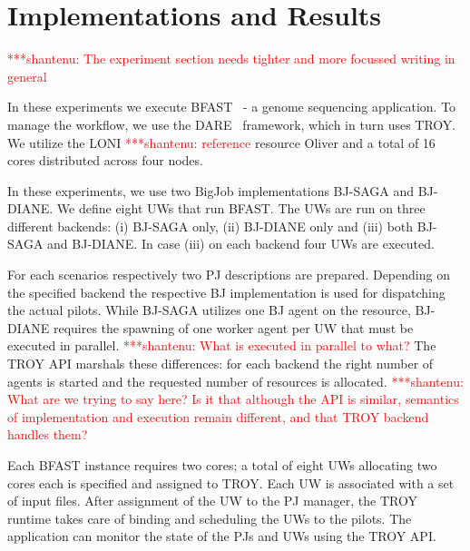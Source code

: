 \documentclass[conference,final]{IEEEtran}
\newcommand{\jhanote}[1]{ {\textcolor{red} { ***shantenu: #1 }}}
\newcommand{\smnote}[1]{ {\textcolor{green} { ***sharath: #1 }}}
\newcommand{\smnote}[1]{}
\newcommand{\jhanote}[1]{}
\newcommand{\upp}{\vspace*{-0.5em}}
\begin{document}
\section{Implementations and Results\upp\upp}


\jhanote{The experiment section needs tighter and more focussed
  writing in general}

In these experiments we execute BFAST~\cite{bfast2009} - a genome
sequencing application. To manage the workflow, we use the
DARE~\cite{dare-tg11} framework, which in turn uses TROY.  We utilize
the LONI\jhanote{reference} resource Oliver and a total of 16 cores
distributed across four nodes.

In these experiments, we use two BigJob implementations BJ-SAGA and
BJ-DIANE. We define eight UWs that run BFAST. The UWs are run on three
different backends: (i) BJ-SAGA only, (ii) BJ-DIANE only and (iii)
both BJ-SAGA and BJ-DIANE. In case (iii) on each backend four UWs are
executed.

For each scenarios respectively two PJ descriptions are
prepared. Depending on the specified backend the respective BJ
implementation is used for dispatching the actual pilots. While
BJ-SAGA utilizes one BJ agent on the resource, BJ-DIANE requires the
spawning of one worker agent per UW that must be executed in
parallel. \jhanote{What is executed in parallel to what?} The TROY API
marshals these differences: for each backend the right number of
agents is started and the requested number of resources is allocated.
\jhanote{What are we trying to say here?  Is it that although the API
  is similar, semantics of implementation and execution remain
  different, and that TROY backend handles them?}

Each BFAST instance requires two cores; a total of eight UWs
allocating two cores each is specified and assigned to TROY. Each UW
is associated with a set of input files. After assignment of the UW to
the PJ manager, the TROY runtime takes care of binding and scheduling
the UWs to the pilots. The application can monitor the state of the
PJs and UWs using the TROY API.


\end{document}
